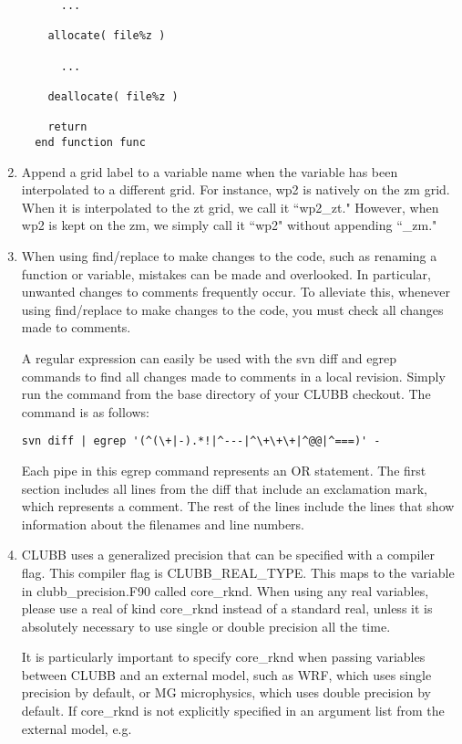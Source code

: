 \documentclass[letterpaper,12pt]{article}
\begin{document}
\begin{enumerate}
\begin{verbatim}
      ...

    allocate( file%z )

      ...

    deallocate( file%z )

    return
  end function func
\end{verbatim}

\item  Append a grid label to a variable name when the variable has been 
interpolated to a different grid.  For instance, wp2 is natively on the zm 
grid.  When it is interpolated to the zt grid, we call it ``wp2\_zt."  
However, when wp2 is kept on the zm, we simply call it ``wp2" without 
appending ``\_zm."

\item  When using find/replace to make changes to the code, such as renaming a function or variable, mistakes can be made and overlooked. In particular, unwanted changes to comments frequently occur. To alleviate this, whenever using find/replace to make changes to the code, you must check all changes made to comments.

A regular expression can easily be used with the svn diff and egrep commands to find all changes made to comments in a local revision. Simply run the command from the base directory of your CLUBB checkout. The command is as follows:

\begin{verbatim}
svn diff | egrep '(^(\+|-).*!|^---|^\+\+\+|^@@|^===)' -
\end{verbatim}

Each pipe in this egrep command represents an OR statement. The first section includes all lines from the diff that include an exclamation mark, which represents a comment. The rest of the lines include the lines that show information about the filenames and line numbers.

\item CLUBB uses a generalized precision that can be specified with a compiler flag. This compiler flag is CLUBB\_REAL\_TYPE. This maps to the variable in clubb\_precision.F90 called core\_rknd. When using any real variables, please use a real of kind core\_rknd instead of a standard real, unless it is absolutely necessary to use single or double precision all the time. 

It is particularly important to specify core\_rknd when passing variables between CLUBB and an external model, such as WRF, which uses single precision by default, or MG microphysics, which uses double precision by default.  If core\_rknd is not explicitly specified in an argument list from the external model, e.g.


\end{enumerate}
\end{document}
